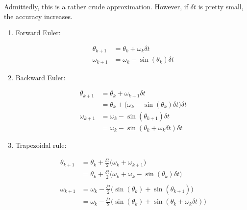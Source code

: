 \documentclass[a4paper,11pt]{report}
\begin{document}
\begin{enumerate}
    Admittedly, this is a rather crude approximation. However, if $\delta t$ is pretty
    small, the accuracy increases.

    \begin{enumerate}

    \item Forward Euler:
    
    \begin{equation*}
    \begin{aligned}
    \theta_{k+1} &= \theta_{k} + \omega_{k} \delta t \\
    \omega_{k+1} &= \omega_{k} - \sin(\theta_{k}) \delta t
    \end{aligned}
    \end{equation*}

    \item Backward Euler:

    \begin{equation*}
    \begin{aligned}
    \theta_{k+1} &= \theta_{k} + \omega_{k+1} \delta t \\
                 &= \theta_{k} + \Big( \omega_{k} - \sin(\theta_{k}) \delta t \Big) \delta t \\
    \omega_{k+1} &= \omega_{k} - \sin(\theta_{k+1}) \delta t \\
                 &= \omega_{k} - \sin(\theta_{k} + \omega_{k} \delta t) \delta t
    \end{aligned}
    \end{equation*}

    \item Trapezoidal rule:

    \begin{equation*}
    \begin{aligned}
    \theta_{k+1} &= \theta_{k} + \frac{\delta t}{2} \Big( \omega_{k} + \omega_{k+1} \Big) \\
                 &= \theta_{k} + \frac{\delta t}{2} \Big( \omega_{k} + \omega_{k} - \sin(\theta_{k}) \delta t \Big) \\ \\
    \omega_{k+1} &= \omega_{k} - \frac{\delta t}{2} \Big( \sin(\theta_{k}) + \sin(\theta_{k+1}) \Big) \\
                 &= \omega_{k} - \frac{\delta t}{2} \Big( \sin(\theta_{k}) + \sin(\theta_{k} + \omega_{k} \delta t) \Big)
    \end{aligned}
    \end{equation*}


\end{enumerate}
\end{enumerate}
\end{document}
